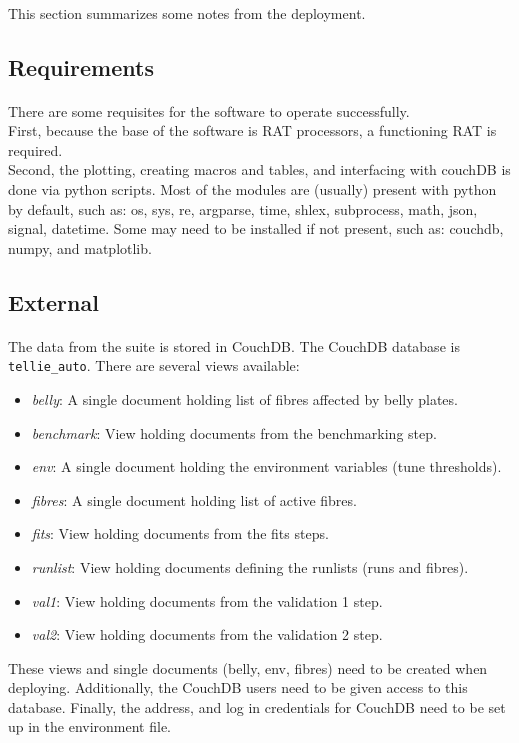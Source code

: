 \documentclass[12pt]{article}
\begin{document}
\paragraph{}
This section summarizes some notes from the deployment.

\subsection{Requirements}
\paragraph{}
There are some requisites for the software to operate successfully.\\
First, because the base of the software is RAT processors, a functioning RAT is required.\\
Second, the plotting, creating macros and tables, and interfacing with couchDB is done via python scripts. Most of the modules are (usually) present with python by default, such as: os, sys, re, argparse, time, shlex, subprocess, math, json, signal, datetime. Some may need to be installed if not present, such as: couchdb, numpy, and matplotlib.

\subsection{External}
\paragraph{}
The data from the suite is stored in CouchDB. The CouchDB database is \texttt{tellie\_auto}. There are several views available:
\begin{itemize}
	\item \textit{belly}: A single document holding list of fibres affected by belly plates.
	\item \textit{benchmark}: View holding documents from the benchmarking step.
	\item \textit{env}: A single document holding the environment variables (tune thresholds).
	\item \textit{fibres}: A single document holding list of active fibres.
	\item \textit{fits}: View holding documents from the fits steps.
	\item \textit{runlist}: View holding documents defining the runlists (runs and fibres).
	\item \textit{val1}: View holding documents from the validation 1 step.
	\item \textit{val2}: View holding documents from the validation 2 step.
\end{itemize}
These views and single documents (belly, env, fibres) need to be created when deploying. Additionally, the CouchDB users need to be given access to this database. Finally, the address, and log in credentials for CouchDB need to be set up in the environment file.
\end{document}
